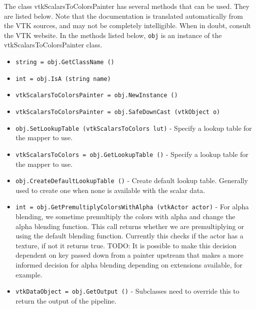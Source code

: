 The class vtkScalarsToColorsPainter has several methods that can be used.
  They are listed below.
Note that the documentation is translated automatically from the VTK sources,
and may not be completely intelligible.  When in doubt, consult the VTK website.
In the methods listed below, \verb|obj| is an instance of the vtkScalarsToColorsPainter class.
\begin{itemize}
\item  \verb|string = obj.GetClassName ()|

\item  \verb|int = obj.IsA (string name)|

\item  \verb|vtkScalarsToColorsPainter = obj.NewInstance ()|

\item  \verb|vtkScalarsToColorsPainter = obj.SafeDownCast (vtkObject o)|

\item  \verb|obj.SetLookupTable (vtkScalarsToColors lut)| -  Specify a lookup table for the mapper to use.

\item  \verb|vtkScalarsToColors = obj.GetLookupTable ()| -  Specify a lookup table for the mapper to use.

\item  \verb|obj.CreateDefaultLookupTable ()| -  Create default lookup table. Generally used to create one when none
 is available with the scalar data.

\item  \verb|int = obj.GetPremultiplyColorsWithAlpha (vtkActor actor)| -  For alpha blending, we sometime premultiply the colors
 with alpha and change the alpha blending function.
 This call returns whether we are premultiplying or using
 the default blending function.
 Currently this checks if the actor has a texture, if not
 it returns true. 
 TODO: It is possible to make this decision
 dependent on key passed down from a painter upstream
 that makes a more informed decision for alpha blending
 depending on extensions available, for example.

\item  \verb|vtkDataObject = obj.GetOutput ()| -  Subclasses need to override this to return the output of the pipeline.

\end{itemize}
